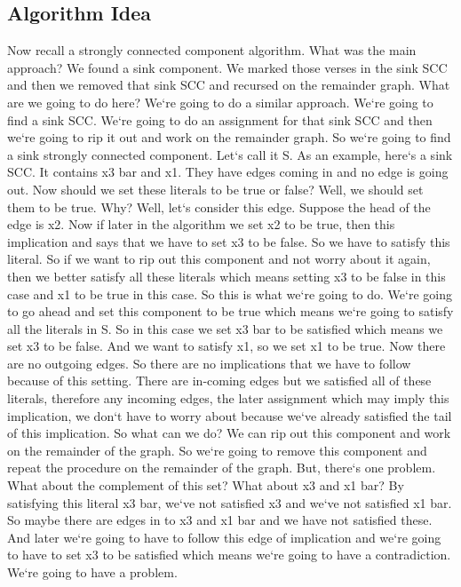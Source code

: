 \subsection{Algorithm Idea}
Now recall a strongly connected component algorithm.
What was the main approach? We found a sink component.
We marked those verses in the sink SCC and then we removed that sink SCC and recursed on the remainder graph.
What are we going to do here? We`re going to do a similar approach.
We`re going to find a sink SCC\@.
We`re going to do an assignment for that sink SCC and then we`re going to rip it out and work on the remainder graph.
So we`re going to find a sink strongly connected component.
Let`s call it S\@.
As an example, here`s a sink SCC\@.
It contains x3 bar and x1.
They have edges coming in and no edge is going out.
Now should we set these literals to be true or false? Well, we should set them to be true.
Why? Well, let`s consider this edge.
Suppose the head of the edge is x2.
Now if later in the algorithm we set x2 to be true, then this implication and says that we have to set x3 to be false.
So we have to satisfy this literal.
So if we want to rip out this component and not worry about it again, then we better satisfy all these literals which means setting x3 to be false in this case and x1 to be true in this case.
So this is what we`re going to do.
We`re going to go ahead and set this component to be true which means we`re going to satisfy all the literals in S\@.
So in this case we set x3 bar to be satisfied which means we set x3 to be false.
And we want to satisfy x1, so we set x1 to be true.
Now there are no outgoing edges.
So there are no implications that we have to follow because of this setting.
There are in-coming edges but we satisfied all of these literals, therefore any incoming edges, the later assignment which may imply this implication, we don`t have to worry about because we`ve already satisfied the tail of this implication.
So what can we do? We can rip out this component and work on the remainder of the graph.
So we`re going to remove this component and repeat the procedure on the remainder of the graph.
But, there`s one problem.
What about the complement of this set? What about x3 and x1 bar? By satisfying this literal x3 bar, we`ve not satisfied x3 and we`ve not satisfied x1 bar.
So maybe there are edges in to x3 and x1 bar and we have not satisfied these.
And later we`re going to have to follow this edge of implication and we`re going to have to set x3 to be satisfied which means we`re going to have a contradiction.
We`re going to have a problem.
